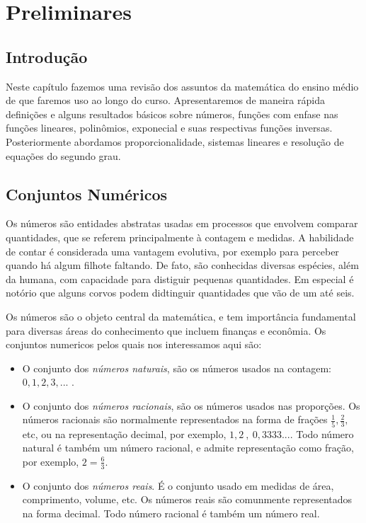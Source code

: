 \chapter{Preliminares}
\thispagestyle{empty}

\section{Introdução}


Neste capítulo fazemos uma revisão dos assuntos da matemática do ensino médio de que faremos uso ao longo do curso.
Apresentaremos de maneira rápida definições e alguns resultados básicos sobre números, funções com enfase nas funções lineares,
polinômios, exponecial e suas respectivas funções inversas. Posteriormente abordamos proporcionalidade,
 sistemas lineares e resolução de equações do segundo grau.

\section{Conjuntos Numéricos}

Os números são entidades abstratas usadas em processos que envolvem comparar quantidades, que se referem principalmente à contagem e medidas.
A habilidade de contar é considerada uma vantagem evolutiva, por exemplo para perceber quando há algum filhote faltando. De fato, são conhecidas diversas espécies,
além da humana,
com capacidade para distiguir pequenas quantidades. Em especial é notório que alguns corvos podem didtinguir quantidades que vão de um até seis.

Os números são o objeto central da matemática, e tem importância fundamental para diversas áreas do conhecimento que incluem finanças e econômia. Os conjuntos numericos pelos quais nos interessamos aqui são:
\begin{itemize}
\item[$\N$:] O conjunto dos {\it números naturais}, são os números usados na contagem: $0,1,2,3,...$ .
\item[$\Q$:] O conjunto dos{ \it  números racionais}, são os números usados nas proporções. Os números racionais
 são normalmente representados na forma de frações $\frac{1}{5}, \frac{2}{3},$  etc, ou na representação
decimal, por exemplo, $1,2\ ,\ 0,3333...$. Todo número natural é também um número racional, e admite representação como fração, por exemplo, $2=\frac{6}{3}$.
\item[$\R$:] O conjunto dos {\it números reais}. É o conjunto usado em medidas de área, comprimento, volume, etc. Os números reais são comunmente representados na forma decimal.
Todo número racional é também um número real.
\end{itemize}


